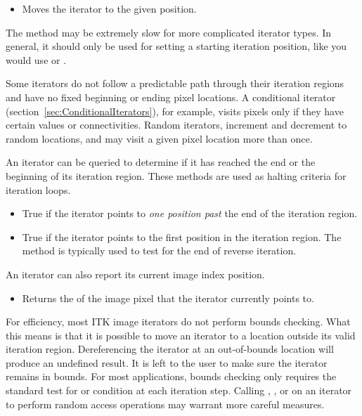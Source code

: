 \begin{itemize}
\item \textbf{} Moves the iterator to the given
 position.
\end{itemize}

The  method may be extremely slow for more complicated
iterator types. In general, it should only be used for setting a starting
iteration position, like you would use  or .

Some iterators do not follow a predictable path through their iteration regions
and have no fixed beginning or ending pixel locations.  A conditional iterator
(section~\ref{sec:ConditionalIterators}), for example, visits pixels only if
they have certain values or connectivities.  Random iterators, increment and
decrement to random locations, and may visit a given pixel location more than
once.

An iterator can be queried to determine if it has reached the end or the
beginning of its iteration region.  These methods are used as halting criteria
for iteration loops.

\begin{itemize}
\item \textbf{} True if the iterator points to \emph{one
position past} the end of the iteration region.

\item \textbf{} True if the iterator points to the first
position in the iteration region.  The method is typically used to test for the
end of reverse iteration.

\end{itemize}

An iterator can also report its current image index position.

\begin{itemize}
\item \textbf{} Returns the 
of the image pixel that the iterator currently points to.
\end{itemize}

For efficiency, most ITK image iterators do not perform bounds checking.  What
this means is that it is possible to move an iterator to a location outside its
valid iteration region.  Dereferencing the iterator at an out-of-bounds location
will produce an undefined result. It is left to the user to make sure the
iterator remains in bounds.  For most applications,  bounds checking only
requires the standard test for  or  condition at each
iteration step.  Calling ,  , or
 on an iterator to perform random access operations may
warrant more careful measures. 

